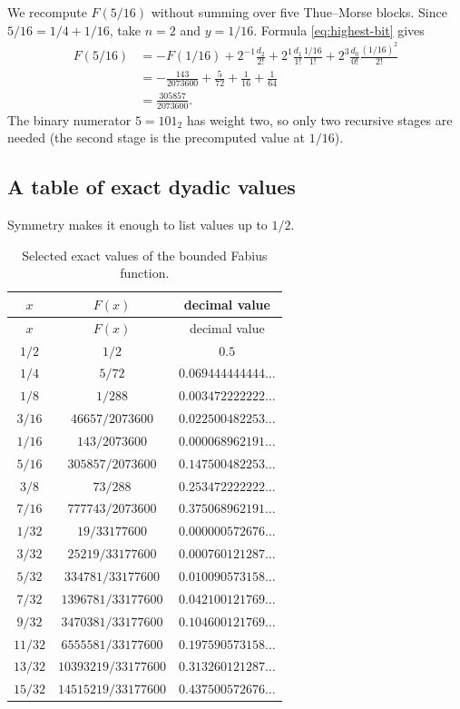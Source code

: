 \documentclass[11pt]{article}
\numberwithin{equation}{section}
\theoremstyle{definition}
\theoremstyle{remark}
\begin{document}
We recompute $F(5/16)$ without summing over five Thue--Morse blocks.  Since
$5/16=1/4+1/16$, take $n=2$ and $y=1/16$.  Formula \eqref{eq:highest-bit} gives
\begin{align*}
 F(5/16)
 &=-F(1/16)
   +2^{-1}\frac{d_2}{2!}
   +2^{1}\frac{d_1}{1!}\frac{1/16}{1!}
   +2^{3}\frac{d_0}{0!}\frac{(1/16)^2}{2!}\\
 &=-\frac{143}{2073600}+\frac5{72}
   +\frac1{16}+\frac1{64}\\
 &=\frac{305857}{2073600}.
\end{align*}
The binary numerator $5=101_2$ has weight two, so only two recursive stages are needed (the second stage is the precomputed value at $1/16$).

\subsection{A table of exact dyadic values}

Symmetry makes it enough to list values up to $1/2$.
\begin{longtable}{c@{\qquad}c@{\qquad}c}
\caption{Selected exact values of the bounded Fabius function.}\label{tab:dyadic-values}\\
\toprule
$x$ & $F(x)$ & decimal value\\
\midrule
\endfirsthead
\toprule
$x$ & $F(x)$ & decimal value\\
\midrule
\endhead
$1/2$&$1/2$&$0.5$\\
$1/4$&$5/72$&$0.069444444444\ldots$\\
$1/8$&$1/288$&$0.003472222222\ldots$\\
$3/16$&$46657/2073600$&$0.022500482253\ldots$\\
$1/16$&$143/2073600$&$0.000068962191\ldots$\\
$5/16$&$305857/2073600$&$0.147500482253\ldots$\\
$3/8$&$73/288$&$0.253472222222\ldots$\\
$7/16$&$777743/2073600$&$0.375068962191\ldots$\\
$1/32$&$19/33177600$&$0.000000572676\ldots$\\
$3/32$&$25219/33177600$&$0.000760121287\ldots$\\
$5/32$&$334781/33177600$&$0.010090573158\ldots$\\
$7/32$&$1396781/33177600$&$0.042100121769\ldots$\\
$9/32$&$3470381/33177600$&$0.104600121769\ldots$\\
$11/32$&$6555581/33177600$&$0.197590573158\ldots$\\
$13/32$&$10393219/33177600$&$0.313260121287\ldots$\\
$15/32$&$14515219/33177600$&$0.437500572676\ldots$\\
\bottomrule
\end{longtable}
\end{document}
